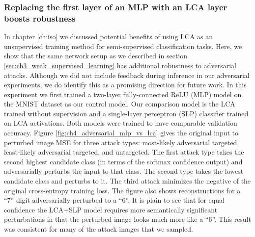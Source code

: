 \subsubsection{Replacing the first layer of an MLP with an LCA layer boosts robustness}
In chapter \ref{ch:iso} we discussed potential benefits of using LCA as an unsupervised training method for semi-supervised classification tasks.
Here, we show that the same network setup as we described in section \ref{sec:ch3_weak_supervised_learning} has additional robustness to adversarial attacks.
Although we did not include feedback during inference in our adversarial experiments, we do identify this as a promising direction for future work.
In this experiment we first trained a two-layer fully-connected ReLU (MLP) model on the MNIST dataset as our control model.
Our comparison model is the LCA trained without supervision and a single-layer perceptron (SLP) classifier trained on LCA activations.
Both models were trained to have comparable validation accuracy.
Figure \ref{fig:ch4_adversarial_mlp_vs_lca} gives the original input to perturbed image MSE for three attack types: most-likely adversarial targeted, least-likely adversarial targeted, and untargeted.
The first attack type takes the second highest candidate class (in terms of the softmax confidence output) and adversarially perturbs the input to that class.
The second type takes the lowest candidate class and perturbs to it.
The third attack minimizes the negative of the original cross-entropy training loss.
The figure also shows reconstructions for a ``7'' digit adversarially perturbed to a ``6''.
It is plain to see that for equal confidence the LCA+SLP model requires more semantically significant perturbations in that the perturbed image looks much more like a ``6''.
This result was consistent for many of the attack images that we sampled.

